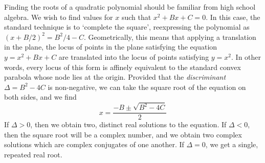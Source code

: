 Finding the roots of a quadratic polynomial should be familiar from high school algebra. We wish to find values for $x$ such that $x^2 + Bx + C  = 0$. In this case, the standard technique is to `complete the square', reexpressing the polynomial as $\left( x + B/2 \right)^2 = B^2/4 - C$. Geometrically, this means that applying a translation in the plane, the locus of points in the plane satisfying the equation $y = x^2 + Bx + C$ are translated into the locus of points satisfying $y = x^2$. In other words, every locus of this form is affinely equivalent to the standard convex parabola whose node lies at the origin. Provided that the {\it discriminant} $\Delta = B^2 - 4C$ is non-negative, we can take the square root of the equation on both sides, and we find
%
\[ x = \frac{-B \pm \sqrt{B^2 - 4C}}{2} \]
%
If $\Delta > 0$, then we obtain two, distinct real solutions to the equation. If $\Delta < 0$, then the square root will be a complex number, and we obtain two complex solutions which are complex conjugates of one another. If $\Delta = 0$, we get a single, repeated real root.

%
%
%
%


